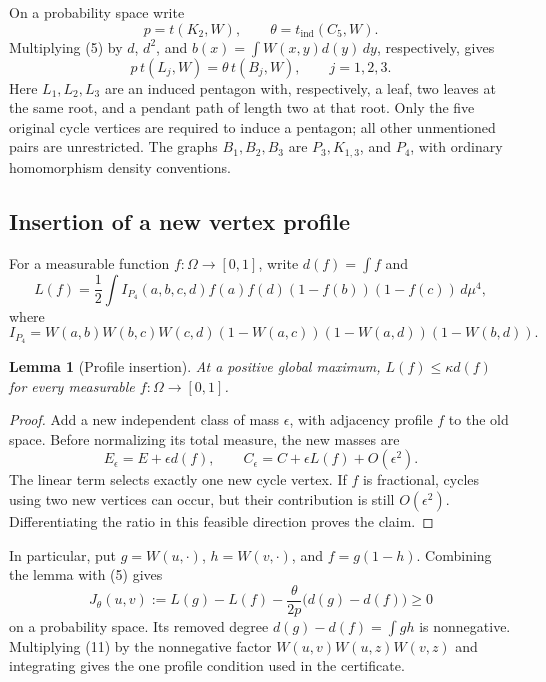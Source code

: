 \documentclass[11pt]{amsart}
\newtheorem{lemma}[theorem]{Lemma}
\theoremstyle{definition}
\theoremstyle{remark}
\begin{document}
On a probability space write
\[
 p=t(K_2,W),\qquad\theta=t_{\mathrm{ind}}(C_5,W).
\]
Multiplying (5) by \(d\), \(d^2\), and
\(b(x)=\int W(x,y)d(y)\,dy\), respectively, gives
\begin{equation}
 p\,t(L_j,W)=\theta\,t(B_j,W),\qquad j=1,2,3.\tag{9}
\end{equation}
Here \(L_1,L_2,L_3\) are an induced pentagon with, respectively, a leaf,
two leaves at the same root, and a pendant path of length two at that root.
Only the five original cycle vertices are required to induce a pentagon;
all other unmentioned pairs are unrestricted. The graphs \(B_1,B_2,B_3\)
are \(P_3,K_{1,3}\), and \(P_4\), with ordinary homomorphism density
conventions.

\subsection{Insertion of a new vertex profile}

For a measurable function \(f:\Omega\to[0,1]\), write \(d(f)=\int f\) and
\begin{equation}
 L(f)=\frac12\int I_{P_4}(a,b,c,d)
                 f(a)f(d)(1-f(b))(1-f(c))\,d\mu^4,\tag{10}
\end{equation}
where
\[
 I_{P_4}=W(a,b)W(b,c)W(c,d)
           (1-W(a,c))(1-W(a,d))(1-W(b,d)).
\]

\begin{lemma}[Profile insertion]\label{lem:profile-insertion}
At a positive global maximum, \(L(f)\le\kappa d(f)\) for every
measurable \(f:\Omega\to[0,1]\).
\end{lemma}
\begin{proof}
Add a new independent class of mass \(\epsilon\), with adjacency profile
\(f\) to the old space. Before normalizing its total measure, the new masses
are
\[
 E_\epsilon=E+\epsilon d(f),\qquad
 C_\epsilon=C+\epsilon L(f)+O(\epsilon^2).
\]
The linear term selects exactly one new cycle vertex. If \(f\) is
fractional, cycles using two new vertices can occur, but their contribution
is still \(O(\epsilon^2)\). Differentiating the ratio in this feasible
direction proves the claim.
\end{proof}

In particular, put \(g=W(u,\cdot)\), \(h=W(v,\cdot)\), and \(f=g(1-h)\).
Combining the lemma with (5) gives
\begin{equation}
 J_\theta(u,v):=L(g)-L(f)
       -\frac{\theta}{2p}\bigl(d(g)-d(f)\bigr)\ge0\tag{11}
\end{equation}
on a probability space. Its removed degree \(d(g)-d(f)=\int gh\) is
nonnegative. Multiplying (11) by the nonnegative factor
\(W(u,v)W(u,z)W(v,z)\) and integrating gives the one profile condition
used in the certificate.
\end{document}
